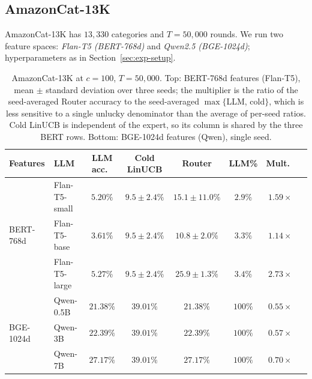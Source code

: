 \documentclass{article}
\theoremstyle{definition}
\theoremstyle{remark}
\theoremstyle{remark}
\begin{document}
\subsection{AmazonCat-13K}
\label{sec:amazon}

AmazonCat-13K has $13{,}330$ categories and $T=50{,}000$ rounds. We run two
feature spaces: \emph{Flan-T5 (BERT-768d)} and \emph{Qwen2.5 (BGE-1024d)};
hyperparameters as in Section~\ref{sec:exp-setup}.

\begin{table}[h]
\centering
\caption{AmazonCat-13K at $c=100$, $T=50{,}000$. Top: BERT-768d features
(Flan-T5), mean $\pm$ standard deviation over three seeds; the multiplier is
the ratio of the seed-averaged Router accuracy to the seed-averaged
$\max\{$LLM, cold$\}$, which is less sensitive to a single unlucky denominator
than the average of per-seed ratios. Cold LinUCB is independent of the expert,
so its column is shared by the three BERT rows. Bottom: BGE-1024d features
(Qwen), single seed.}
\label{tab:amazon-results}
\small
\begin{tabular}{@{}llcccccc@{}}
\toprule
Features & LLM & LLM acc.\ & Cold LinUCB & Router & LLM\% & Mult.\ \\
\midrule
\multirow{3}{*}{BERT-768d} & Flan-T5-small  & $5.20\%$ & $9.5\pm2.4\%$ & $15.1\pm11.0\%$ & $2.9\%$  & $1.59\times$ \\
& Flan-T5-base  & $3.61\%$ & $9.5\pm2.4\%$ & $10.8\pm2.0\%$ & $3.3\%$  & $1.14\times$ \\
& Flan-T5-large & $5.27\%$ & $9.5\pm2.4\%$ & $\mathbf{25.9\pm1.3\%}$ & $3.4\%$  & $\mathbf{2.73\times}$ \\
\midrule
\multirow{3}{*}{BGE-1024d} & Qwen-0.5B  & $21.38\%$ & $39.01\%$ & $21.38\%$ & $100\%$  & $0.55\times$ \\
& Qwen-3B  & $22.39\%$ & $39.01\%$ & $22.39\%$ & $100\%$  & $0.57\times$ \\
& Qwen-7B  & $27.17\%$ & $39.01\%$ & $27.17\%$ & $100\%$  & $0.70\times$ \\
\bottomrule
\end{tabular}
\end{table}
\end{document}
